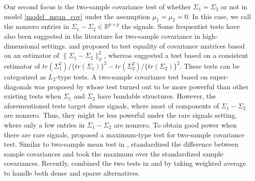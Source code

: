 \documentclass[11pt]{article}
\newcommand{\sg}{\Sigma}
\newcommand{\lra}{\longrightarrow}
\newcommand{\bbR}{\mathbb{R}}
\begin{document}
Our second focus is the two-sample covariance test of whether $\sg_1=\sg_2$ or not in model \eqref{model_mean_cov} under the assumption $\mu_1=\mu_2=0$.
In this case, we call the nonzero entries in $\sg_1 - \sg_2 \in \bbR^{p\times p}$ the signals.
Some frequentist tests have also been suggested in the literature for two-sample covariance in high-dimensional settings.
\cite{schott2007test} and \cite{li2012two} proposed to test equality of covariance matrices based on an estimator of $\| \sg_{1} - \sg_{2}\|_F^2$, whereas \cite{srivastava2010testing} suggested a test based on a consistent estimator of $tr(\sg_{1}^2)/\{tr(\sg_{1})\}^2 - tr(\sg_{2}^2)/\{tr(\sg_{2})\}^2$.
These tests can be categorized as $L_2$-type tests.
A two-sample covariance test based on super-diagonals was proposed by \cite{he2018high} whose test turned out to be more powerful than other existing tests when $\sg_{1}$ and $\sg_{2}$ have bandable structures.
However, the aforementioned tests target dense signals, where most of components of $\sg_1-\sg_2$ are nonzero.
Thus, they might be less powerful under the rare signals setting, where only a few entries in $\sg_{1}-\sg_{2}$ are nonzero.
To obtain good power when there are rare signals, \cite{cai2013two} proposed a maximum-type test for two-sample covariance test.
Similar to two-sample mean test in \cite{cai2014two}, \cite{cai2013two} standardized the difference between sample covariances and took the maximum over the standardized sample covariances.
Recently, \cite{zheng2017testing} combined the two tests in \cite{li2012two} and \cite{cai2013two} by taking weighted average to handle both dense and sparse alternatives.
\end{document}
